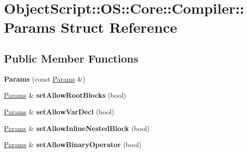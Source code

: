 \hypertarget{struct_object_script_1_1_o_s_1_1_core_1_1_compiler_1_1_params}{}\section{Object\+Script\+:\+:OS\+:\+:Core\+:\+:Compiler\+:\+:Params Struct Reference}
\label{struct_object_script_1_1_o_s_1_1_core_1_1_compiler_1_1_params}
\subsection*{Public Member Functions}
\begin{DoxyCompactItemize}
\item 
{\bfseries Params} (const \hyperlink{struct_object_script_1_1_o_s_1_1_core_1_1_compiler_1_1_params}{Params} \&)\hypertarget{struct_object_script_1_1_o_s_1_1_core_1_1_compiler_1_1_params_aa2fbfc83445b91f5a3d66f63683cd88d}{}\label{struct_object_script_1_1_o_s_1_1_core_1_1_compiler_1_1_params_aa2fbfc83445b91f5a3d66f63683cd88d}

\item 
\hyperlink{struct_object_script_1_1_o_s_1_1_core_1_1_compiler_1_1_params}{Params} \& {\bfseries set\+Allow\+Root\+Blocks} (bool)\hypertarget{struct_object_script_1_1_o_s_1_1_core_1_1_compiler_1_1_params_a3a7c71b0fc0989aa057382b188b1ecb4}{}\label{struct_object_script_1_1_o_s_1_1_core_1_1_compiler_1_1_params_a3a7c71b0fc0989aa057382b188b1ecb4}

\item 
\hyperlink{struct_object_script_1_1_o_s_1_1_core_1_1_compiler_1_1_params}{Params} \& {\bfseries set\+Allow\+Var\+Decl} (bool)\hypertarget{struct_object_script_1_1_o_s_1_1_core_1_1_compiler_1_1_params_a3860bfe9c06b3470fcc052e9aa9eef78}{}\label{struct_object_script_1_1_o_s_1_1_core_1_1_compiler_1_1_params_a3860bfe9c06b3470fcc052e9aa9eef78}

\item 
\hyperlink{struct_object_script_1_1_o_s_1_1_core_1_1_compiler_1_1_params}{Params} \& {\bfseries set\+Allow\+Inline\+Nested\+Block} (bool)\hypertarget{struct_object_script_1_1_o_s_1_1_core_1_1_compiler_1_1_params_ae81cbed0de667c53533dcb13d65d287f}{}\label{struct_object_script_1_1_o_s_1_1_core_1_1_compiler_1_1_params_ae81cbed0de667c53533dcb13d65d287f}

\item 
\hyperlink{struct_object_script_1_1_o_s_1_1_core_1_1_compiler_1_1_params}{Params} \& {\bfseries set\+Allow\+Binary\+Operator} (bool)\hypertarget{struct_object_script_1_1_o_s_1_1_core_1_1_compiler_1_1_params_ae95f947d50edccb32ec3f2c0b1dfd5a1}{}\label{struct_object_script_1_1_o_s_1_1_core_1_1_compiler_1_1_params_ae95f947d50edccb32ec3f2c0b1dfd5a1}


\end{DoxyCompactItemize}
